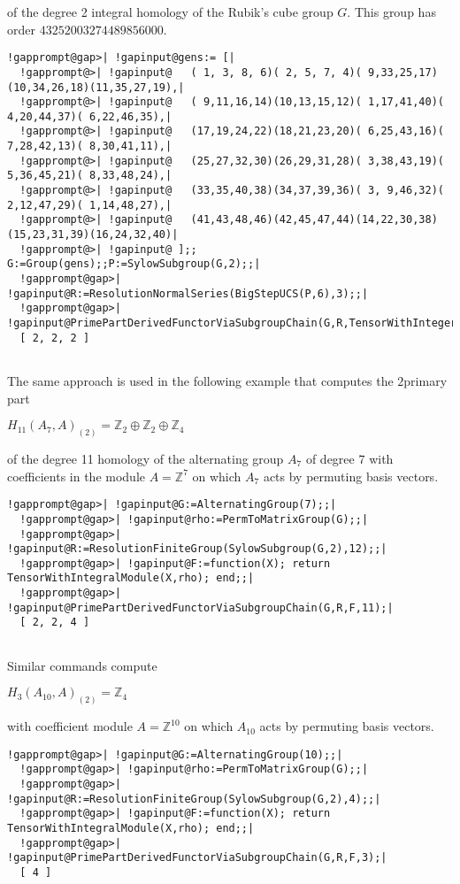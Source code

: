 \documentclass[a4paper,11pt]{report}
\begin{document}
{{of the degree 2 integral homology of the Rubik's cube group $G$. This group has order $43252003274489856000$. 
\begin{Verbatim}[commandchars=!@|,fontsize=\small,frame=single,label=Example]
  !gapprompt@gap>| !gapinput@gens:= [|
  !gapprompt@>| !gapinput@   ( 1, 3, 8, 6)( 2, 5, 7, 4)( 9,33,25,17)(10,34,26,18)(11,35,27,19),|
  !gapprompt@>| !gapinput@   ( 9,11,16,14)(10,13,15,12)( 1,17,41,40)( 4,20,44,37)( 6,22,46,35),|
  !gapprompt@>| !gapinput@   (17,19,24,22)(18,21,23,20)( 6,25,43,16)( 7,28,42,13)( 8,30,41,11),|
  !gapprompt@>| !gapinput@   (25,27,32,30)(26,29,31,28)( 3,38,43,19)( 5,36,45,21)( 8,33,48,24),|
  !gapprompt@>| !gapinput@   (33,35,40,38)(34,37,39,36)( 3, 9,46,32)( 2,12,47,29)( 1,14,48,27),|
  !gapprompt@>| !gapinput@   (41,43,48,46)(42,45,47,44)(14,22,30,38)(15,23,31,39)(16,24,32,40)|
  !gapprompt@>| !gapinput@ ];; G:=Group(gens);;P:=SylowSubgroup(G,2);;|
  !gapprompt@gap>| !gapinput@R:=ResolutionNormalSeries(BigStepUCS(P,6),3);;|
  !gapprompt@gap>| !gapinput@PrimePartDerivedFunctorViaSubgroupChain(G,R,TensorWithIntegers,2);|
  [ 2, 2, 2 ]
  
\end{Verbatim}
 The same approach is used in the following example that computes the $2$\texttt{}primary part 

$H_{11}(A_7,A)_{(2)} = \mathbb Z_2 \oplus \mathbb Z_2\oplus \mathbb Z_4$ 

of the degree 11 homology of the alternating group $A_7$ of degree $7$ with coefficients in the module $A=\mathbb Z^7$ on which $A_7$ acts by permuting basis vectors. 
\begin{Verbatim}[commandchars=!@|,fontsize=\small,frame=single,label=Example]
  !gapprompt@gap>| !gapinput@G:=AlternatingGroup(7);;|
  !gapprompt@gap>| !gapinput@rho:=PermToMatrixGroup(G);;|
  !gapprompt@gap>| !gapinput@R:=ResolutionFiniteGroup(SylowSubgroup(G,2),12);;|
  !gapprompt@gap>| !gapinput@F:=function(X); return TensorWithIntegralModule(X,rho); end;;|
  !gapprompt@gap>| !gapinput@PrimePartDerivedFunctorViaSubgroupChain(G,R,F,11);|
  [ 2, 2, 4 ]
  
\end{Verbatim}
 Similar commands compute 

$H_{3}(A_{10},A)_{(2)} = \mathbb Z_4$ 

with coefficient module $A=\mathbb Z^{10}$ on which $A_{10}$ acts by permuting basis vectors. 
\begin{Verbatim}[commandchars=!@|,fontsize=\small,frame=single,label=Example]
  !gapprompt@gap>| !gapinput@G:=AlternatingGroup(10);;|
  !gapprompt@gap>| !gapinput@rho:=PermToMatrixGroup(G);;|
  !gapprompt@gap>| !gapinput@R:=ResolutionFiniteGroup(SylowSubgroup(G,2),4);;|
  !gapprompt@gap>| !gapinput@F:=function(X); return TensorWithIntegralModule(X,rho); end;;|
  !gapprompt@gap>| !gapinput@PrimePartDerivedFunctorViaSubgroupChain(G,R,F,3);|
  [ 4 ]
  

\end{Verbatim}}}
\end{document}
